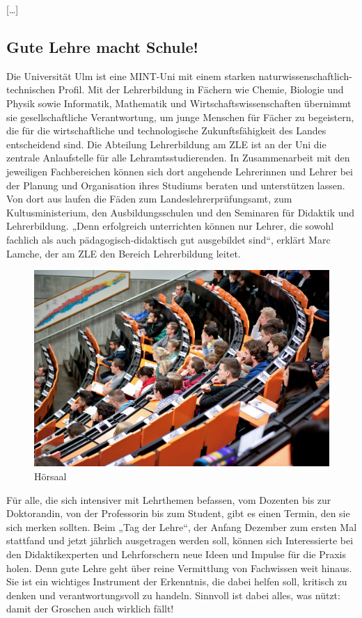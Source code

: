 [\ldots]

\subsection{Gute Lehre macht Schule!}
\label{subsec:1.2}

Die Universität Ulm ist eine MINT-Uni mit einem starken naturwissenschaftlich-technischen Profil. Mit der Lehrerbildung in Fächern wie Chemie, Biologie und Physik sowie Informatik, Mathematik und Wirtschaftswissenschaften übernimmt sie gesellschaftliche Verantwortung, um junge Menschen für Fächer zu begeistern, die für die wirtschaftliche und technologische Zukunftsfähigkeit des Landes entscheidend sind. Die Abteilung Lehrerbildung am ZLE ist an der Uni die zentrale Anlaufstelle für alle Lehramtsstudierenden. In Zusammenarbeit mit den jeweiligen Fachbereichen können sich dort angehende Lehrerinnen und Lehrer bei der Planung und Organisation ihres Studiums beraten und unterstützen lassen. Von dort aus laufen die Fäden zum Landeslehrerprüfungsamt, zum Kultusministerium, den Ausbildungsschulen und den Seminaren für Didaktik und Lehrerbildung. „Denn erfolgreich unterrichten können nur Lehrer, die sowohl fachlich als auch pädagogisch-didaktisch gut ausgebildet sind“, erklärt Marc Lamche, der am ZLE den Bereich Lehrerbildung leitet. 

\begin{figure}
    \includegraphics[width=\linewidth]{rohmaterial-bilder/studenten-hoersaal.jpg}
    \caption{Hörsaal}
\end{figure}

Für alle, die sich intensiver mit Lehrthemen befassen, vom Dozenten bis zur Doktorandin, von der Professorin bis zum Student, gibt es einen Termin, den sie sich merken sollten. Beim „Tag der Lehre“, der Anfang Dezember zum ersten Mal stattfand und jetzt jährlich ausgetragen werden soll, können sich Interessierte bei den Didaktikexperten und Lehrforschern neue Ideen und Impulse für die Praxis holen. Denn gute Lehre geht über reine Vermittlung von Fachwissen weit hinaus. Sie ist ein wichtiges Instrument der Erkenntnis, die dabei helfen soll, kritisch zu denken und verantwortungsvoll zu handeln. Sinnvoll ist dabei alles, was nützt: damit der Groschen auch wirklich fällt! 



